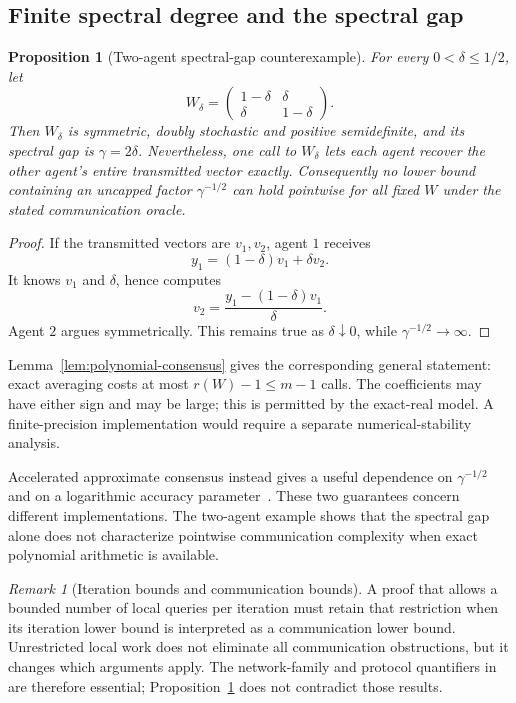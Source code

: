 \documentclass[11pt,a4paper]{article}
\newtheorem{proposition}[theorem]{Proposition}
\theoremstyle{remark}
\newtheorem{remark}[theorem]{Remark}
\begin{document}
\subsection{Finite spectral degree and the spectral gap}

\begin{proposition}[Two-agent spectral-gap counterexample]
\label{prop:two-agent}
For every $0<\delta\le1/2$, let
\begin{equation}
 W_\delta=
 \begin{pmatrix}
 1-\delta&\delta\\
 \delta&1-\delta
 \end{pmatrix}.
 \label{eq:two-agent-W}
\end{equation}
Then $W_\delta$ is symmetric, doubly stochastic and positive semidefinite, and
its spectral gap is $\gamma=2\delta$.  Nevertheless, one call to $W_\delta$
lets each agent recover the other agent's entire transmitted vector exactly.
Consequently no lower bound containing an uncapped factor
$\gamma^{-1/2}$ can hold pointwise for all fixed $W$ under the stated
communication oracle.
\end{proposition}

\begin{proof}
If the transmitted vectors are $v_1,v_2$, agent $1$ receives
\[
 y_1=(1-\delta)v_1+\delta v_2.
\]
It knows $v_1$ and $\delta$, hence computes
\[
 v_2=\frac{y_1-(1-\delta)v_1}{\delta}.
\]
Agent $2$ argues symmetrically.  This remains true as $\delta\downarrow0$,
while $\gamma^{-1/2}\to\infty$.
\end{proof}


Lemma~\ref{lem:polynomial-consensus} gives the corresponding general
statement: exact averaging costs at most $r(W)-1\le m-1$ calls. The
coefficients may have either sign and may be large; this is permitted by
the exact-real model. A finite-precision implementation would require a
separate numerical-stability analysis.

Accelerated approximate consensus instead gives a useful dependence on
$\gamma^{-1/2}$ and on a logarithmic accuracy parameter~\cite{relaxed2025}.
These two guarantees concern different implementations. The two-agent
example shows that the spectral gap alone does not characterize pointwise
communication complexity when exact polynomial arithmetic is available.

\begin{remark}[Iteration bounds and communication bounds]
A proof that allows a bounded number of local queries per iteration must
retain that restriction when its iteration lower bound is interpreted as
a communication lower bound. Unrestricted local work does not eliminate
all communication obstructions, but it changes which arguments apply.
The network-family and protocol quantifiers in~\cite{ludesa2021} are
therefore essential; Proposition~\ref{prop:two-agent} does not contradict
those results.
\end{remark}
\end{document}
